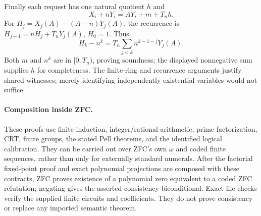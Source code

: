 Finally each request has one natural quotient $h$ and
\[
 X_i+nY_i=AY_i+m+T_nh.
\]
For $H_j=X_j(A)-(A-n)Y_j(A)$, the recurrence is
$H_{j+1}=nH_j+T_nY_j(A)$, $H_0=1$.  Thus
\[
 H_k-n^k=T_n\sum_{j<k}n^{k-1-j}Y_j(A).
\]
Both $m$ and $n^k$ are in $[0,T_n)$, proving soundness; the displayed
nonnegative sum supplies $h$ for completeness.  The finite-ring and
recurrence arguments justify shared witnesses; merely identifying
independently existential variables would not suffice.

\paragraph{Composition inside ZFC.}
These proofs use finite induction, integer/rational arithmetic, prime
factorization, CRT, finite groups, the stated Pell theorems, and the
identified logical calibration.  They can be carried out over ZFC's own
$\omega$ and coded finite sequences, rather than only for externally
standard numerals.  After the factorial fixed-point proof and exact
polynomial projections are composed with these contracts, ZFC proves
existence of a polynomial zero equivalent to a coded ZFC refutation;
negating gives the asserted consistency biconditional.  Exact file checks
verify the supplied finite circuits and coefficients.  They do not prove
consistency or replace any imported semantic theorem.
